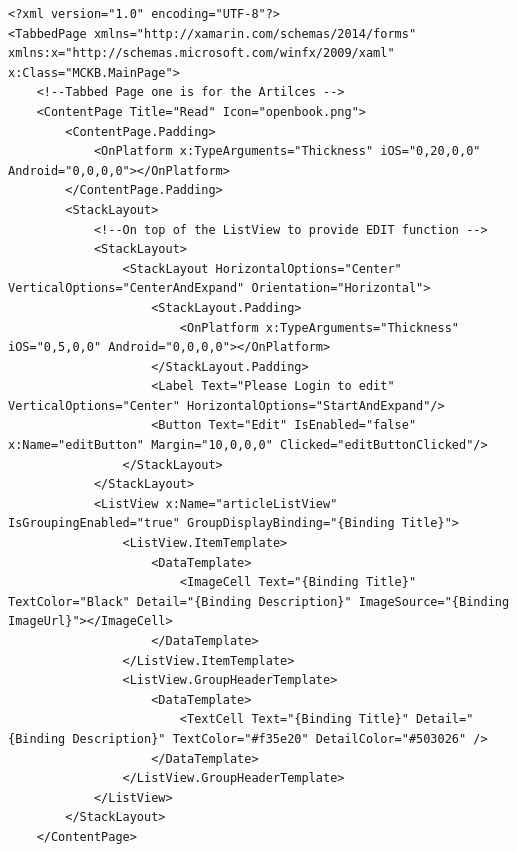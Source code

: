 	\newpage
	\begin{lstlisting}[caption={MCKB - Design XAML Code},label={lst:mckbdesigncode},captionpos=b,style=XML-Own]
<?xml version="1.0" encoding="UTF-8"?>
<TabbedPage xmlns="http://xamarin.com/schemas/2014/forms" xmlns:x="http://schemas.microsoft.com/winfx/2009/xaml" x:Class="MCKB.MainPage">
    <!--Tabbed Page one is for the Artilces -->
    <ContentPage Title="Read" Icon="openbook.png">
        <ContentPage.Padding>
            <OnPlatform x:TypeArguments="Thickness" iOS="0,20,0,0" Android="0,0,0,0"></OnPlatform>
        </ContentPage.Padding>
        <StackLayout>
            <!--On top of the ListView to provide EDIT function -->
            <StackLayout>
                <StackLayout HorizontalOptions="Center" VerticalOptions="CenterAndExpand" Orientation="Horizontal">
                    <StackLayout.Padding>
                        <OnPlatform x:TypeArguments="Thickness" iOS="0,5,0,0" Android="0,0,0,0"></OnPlatform>
                    </StackLayout.Padding>
                    <Label Text="Please Login to edit" VerticalOptions="Center" HorizontalOptions="StartAndExpand"/>
                    <Button Text="Edit" IsEnabled="false" x:Name="editButton" Margin="10,0,0,0" Clicked="editButtonClicked"/>
                </StackLayout>
            </StackLayout>
            <ListView x:Name="articleListView" IsGroupingEnabled="true" GroupDisplayBinding="{Binding Title}">
                <ListView.ItemTemplate>
                    <DataTemplate>
                        <ImageCell Text="{Binding Title}" TextColor="Black" Detail="{Binding Description}" ImageSource="{Binding ImageUrl}"></ImageCell>
                    </DataTemplate>
                </ListView.ItemTemplate>
                <ListView.GroupHeaderTemplate>
                    <DataTemplate>
                        <TextCell Text="{Binding Title}" Detail="{Binding Description}" TextColor="#f35e20" DetailColor="#503026" />
                    </DataTemplate>
                </ListView.GroupHeaderTemplate>
            </ListView>
        </StackLayout>
    </ContentPage>


\end{lstlisting}
